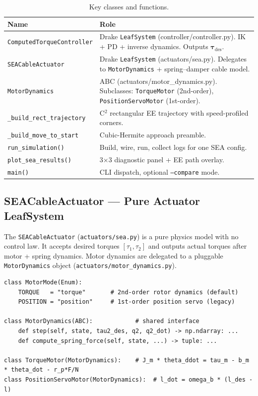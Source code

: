\documentclass[11pt,a4paper]{article}
\newcommand{\btau}{\bm{\tau}}
\begin{document}
\begin{table}[H]
\centering
\caption{Key classes and functions.}
\begin{tabular}{p{5.5cm}p{8cm}}
\toprule
\textbf{Name} & \textbf{Role} \\
\midrule
\texttt{ComputedTorqueController}     & Drake \texttt{LeafSystem} (controller/controller.py). IK + PD + inverse dynamics. Outputs $\btau_{\mathrm{des}}$. \\
\texttt{SEACableActuator}             & Drake \texttt{LeafSystem} (actuators/sea.py). Delegates to \texttt{MotorDynamics} + spring--damper cable model. \\
\texttt{MotorDynamics}                & ABC (actuators/motor\_dynamics.py). Subclasses: \texttt{TorqueMotor} (2nd-order), \texttt{PositionServoMotor} (1st-order). \\
\texttt{\_build\_rect\_trajectory} & C$^2$ rectangular EE trajectory with speed-profiled corners. \\
\texttt{\_build\_move\_to\_start}  & Cubic-Hermite approach preamble. \\
\texttt{run\_simulation()}        & Build, wire, run, collect logs for one SEA config. \\
\texttt{plot\_sea\_results()}     & 3$\times$3 diagnostic panel + EE path overlay. \\
\texttt{main()}                   & CLI dispatch, optional \texttt{--compare} mode. \\
\bottomrule
\end{tabular}
\end{table}

\subsection{SEACableActuator --- Pure Actuator LeafSystem}

The \texttt{SEACableActuator} (\texttt{actuators/sea.py}) is a pure physics model with no control law.  It accepts desired torques $[\tau_1, \tau_2]$ and outputs actual torques after motor + spring dynamics.  Motor dynamics are delegated to a pluggable \texttt{MotorDynamics} object (\texttt{actuators/motor\_dynamics.py}).

\begin{lstlisting}[caption={Motor dynamics class hierarchy (actuators/motor\_dynamics.py).}]
class MotorMode(Enum):
    TORQUE   = "torque"       # 2nd-order rotor dynamics (default)
    POSITION = "position"     # 1st-order position servo (legacy)

class MotorDynamics(ABC):            # shared interface
    def step(self, state, tau2_des, q2, q2_dot) -> np.ndarray: ...
    def compute_spring_force(self, state, ...) -> tuple: ...

class TorqueMotor(MotorDynamics):    # J_m * theta_ddot = tau_m - b_m * theta_dot - r_p*F/N
class PositionServoMotor(MotorDynamics):  # l_dot = omega_b * (l_des - l)
\end{lstlisting}
\end{document}
